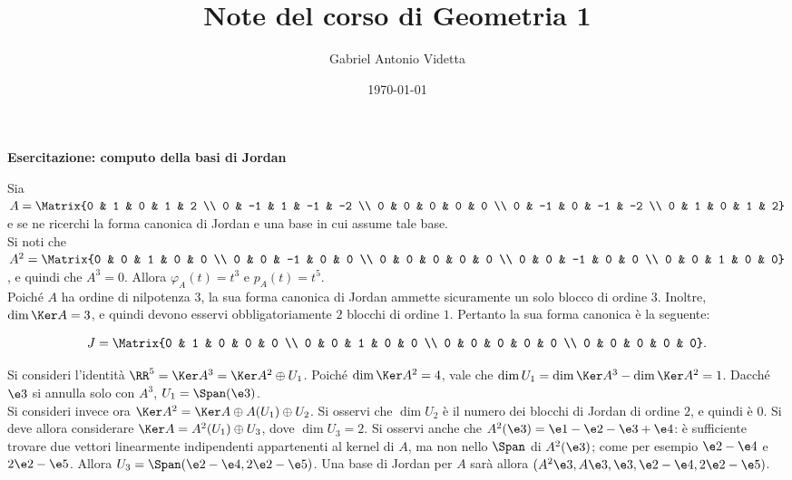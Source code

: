 \documentclass[11pt]{article}
\title{\textbf{Note del corso di Geometria 1}}
\author{Gabriel Antonio Videtta}
\date{\today}
\begin{document}
	
	\maketitle
	
	\begin{center}
		\Large \textbf{Esercitazione: computo della basi di Jordan}
	\end{center}

	\begin{example}
		Sia $A = \Matrix{0 & 1 & 0 & 1 & 2 \\ 0 & -1 & 1 & -1 & -2 \\ 0 & 0 & 0 & 0 & 0 \\ 0 & -1 & 0 & -1 & -2 \\ 0 & 1 & 0 & 1 & 2}$ e se ne ricerchi
		la forma canonica di Jordan e una base in cui assume tale base. \\
		
		Si noti che $A^2 = \Matrix{0 & 0 & 1 & 0 & 0 \\ 0 & 0 & -1 & 0 & 0 \\ 0 & 0 & 0 & 0 & 0 \\ 0 & 0 & -1 & 0 & 0 \\ 0 & 0 & 1 & 0 & 0}$, e quindi
		che $A^3 = 0$. Allora $\varphi_A(t) = t^3$ e $p_A(t) = t^5$. \\
		
		Poiché $A$ ha ordine di nilpotenza $3$, la sua forma canonica
		di Jordan ammette sicuramente un solo blocco
		di ordine $3$. Inoltre, $\dim \Ker A = 3$, e quindi
		devono esservi obbligatoriamente $2$ blocchi di ordine $1$.
		Pertanto la sua forma canonica è la seguente:
		
		\[ J=\Matrix{0 & 1 & 0 & 0 & 0 \\ 0 & 0 & 1 & 0 & 0 \\ 0 & 0 & 0 & 0 & 0 \\ 0 & 0 & 0 & 0 & 0}. \]
		
		\vskip 0.05in
		
		Si consideri l'identità $\RR^5 = \Ker A^3 = \Ker A^2 \oplus U_1$.
		Poiché $\dim \Ker A^2 = 4$, vale che $\dim U_1 = \dim \Ker A^3
		- \dim \Ker A^2 = 1$. Dacché $\e3$ si annulla solo con $A^3$,
		$U_1 = \Span(\e3)$. \\
		
		Si consideri invece ora $\Ker A^2 = \Ker A \oplus A(U_1) \oplus U_2$.
		Si osservi che $\dim U_2$ è il numero dei blocchi di Jordan di
		ordine $2$, e quindi è $0$. Si deve allora considerare $\Ker A =
		A^2(U_1) \oplus U_3$, dove $\dim U_3 = 2$. Si osservi anche che $A^2(\e3) = \e1-\e2-\e3+\e4$: è sufficiente trovare due vettori
		linearmente indipendenti appartenenti al kernel di $A$, ma non
		nello $\Span$ di $A^2(\e3)$; come per esempio $\e2-\e4$ e $2\e2-\e5$.
		Allora $U_3 = \Span(\e2-\e4, 2\e2-\e5)$. Una base di Jordan per $A$
		sarà allora $(A^2 \e3, A \e3, \e3, \e2-\e4, 2\e2-\e5)$.
	\end{example}
\end{document}
